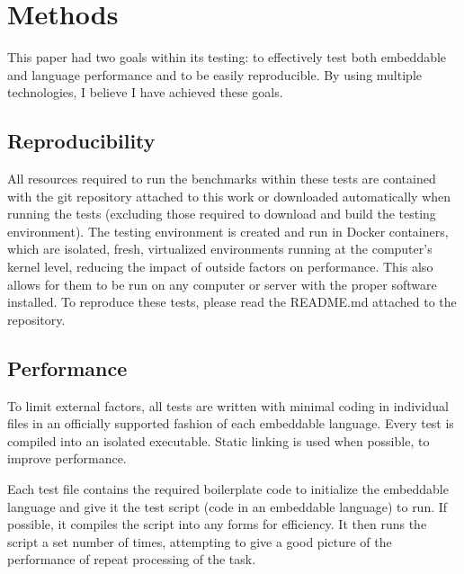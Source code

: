 \section{Methods}
This paper had two goals within its testing: to effectively test both embeddable and language performance and to be easily reproducible. By using multiple technologies, I believe I have achieved these goals.

\subsection{Reproducibility}
All resources required to run the benchmarks within these tests are contained with the git repository attached to this work or downloaded automatically when running the tests (excluding those required to download and build the testing environment). The testing environment is created and run in Docker containers, which are isolated, fresh, virtualized environments running at the computer's kernel level, reducing the impact of outside factors on performance. This also allows for them to be run on any computer or server with the proper software installed. To reproduce these tests, please read the README.md attached to the repository.

\subsection{Performance}
To limit external factors, all tests are written with minimal coding in individual files in an officially supported fashion of each embeddable language. Every test is compiled into an isolated executable. Static linking is used when possible, to improve performance. 

Each test file contains the required boilerplate code to initialize the embeddable language and give it the test script (code in an embeddable language) to run. If possible, it compiles the script into any forms for efficiency. It then runs the script a set number of times, attempting to give a good picture of the performance of repeat processing of the task.

